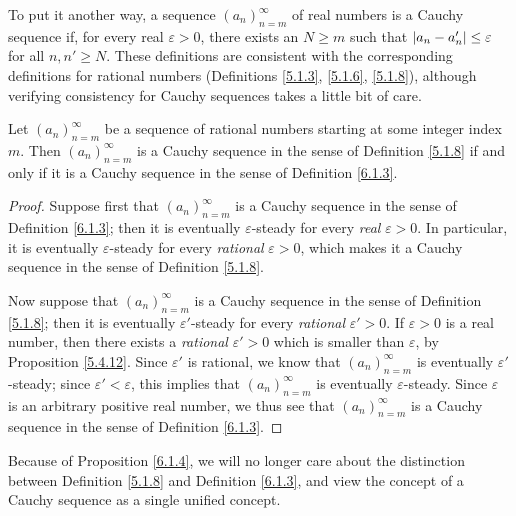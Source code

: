 \begin{note}
    To put it another way, a sequence \((a_n)_{n = m}^\infty\) of real numbers is a Cauchy sequence if, for every real \(\varepsilon > 0\), there exists an \(N \geq m\) such that \(\abs*{a_n - a_n'} \leq \varepsilon\) for all \(n, n' \geq N\).
    These definitions are consistent with the corresponding definitions for rational numbers (Definitions \ref{5.1.3}, \ref{5.1.6}, \ref{5.1.8}), although verifying consistency for Cauchy sequences takes a little bit of care.
\end{note}

\begin{proposition}\label{6.1.4}
    Let \((a_n)_{n = m}^\infty\) be a sequence of rational numbers starting at some integer index \(m\).
    Then \((a_n)_{n = m}^\infty\) is a Cauchy sequence in the sense of Definition \ref{5.1.8} if and only if it is a Cauchy sequence in the sense of Definition \ref{6.1.3}.
\end{proposition}

\begin{proof}
    Suppose first that \((a_n)_{n = m}^\infty\) is a Cauchy sequence in the sense of Definition \ref{6.1.3};
    then it is eventually \(\varepsilon\)-steady for every \emph{real} \(\varepsilon > 0\).
    In particular, it is eventually \(\varepsilon\)-steady for every \emph{rational} \(\varepsilon > 0\), which makes it a Cauchy sequence in the sense of Definition \ref{5.1.8}.

    Now suppose that \((a_n)_{n = m}^\infty\) is a Cauchy sequence in the sense of Definition \ref{5.1.8};
    then it is eventually \(\varepsilon'\)-steady for every \emph{rational} \(\varepsilon' > 0\).
    If \(\varepsilon > 0\) is a real number, then there exists a \emph{rational} \(\varepsilon' > 0\) which is smaller than \(\varepsilon\), by Proposition \ref{5.4.12}.
    Since \(\varepsilon'\) is rational, we know that \((a_n)_{n = m}^\infty\) is eventually \(\varepsilon'\)-steady;
    since \(\varepsilon' < \varepsilon\), this implies that \((a_n)_{n = m}^\infty\) is eventually \(\varepsilon\)-steady.
    Since \(\varepsilon\) is an arbitrary positive real number, we thus see that \((a_n)_{n = m}^\infty\) is a Cauchy sequence in the sense of Definition \ref{6.1.3}.
\end{proof}

\begin{note}
    Because of Proposition \ref{6.1.4}, we will no longer care about the distinction between Definition \ref{5.1.8} and Definition \ref{6.1.3}, and view the concept of a Cauchy sequence as a single unified concept.
\end{note}

